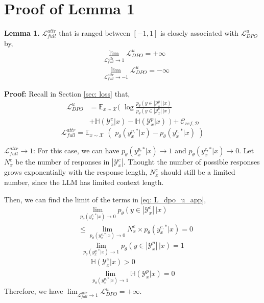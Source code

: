\section{Proof of Lemma 1} \label{sec: lemma1}

\noindent\textbf{Lemma 1.} $\mathcal L^{attr}_{full}$ that is ranged between $[-1,1]$ is closely associated with $\mathcal L_{DPO}^u$ by,
\begin{align}
    &\lim_{\mathcal L^{attr}_{full}\rightarrow 1}  \mathcal L^u_{DPO} = +\infty \\
    &\lim_{\mathcal L^{attr}_{full}\rightarrow -1}  \mathcal L^u_{DPO} = -\infty 
\end{align}

\noindent \textbf{Proof:}
Recall in Section \ref{sec: loss} that,
%
\begin{equation}
  \begin{split} \label{eq: L_dpo_u_app}
    \mathcal L^u_{DPO} &= \mathbb E_{x\sim \mathcal X } ( \,\,\log \frac{p_\theta(y\in |\mathcal Y^p_x|\,|x)}{p_\theta(y\in |\mathcal Y^c_x|\,|x)} \\
    &+ \mathbb H(\mathcal Y^c_x|x) - \mathbb H(\mathcal Y^p_x|x) \,\,) + \mathcal C_{ref, \mathcal D}
  \end{split}
\end{equation}
%
\begin{equation} \label{eq: attr_full_app}
    \mathcal L^{attr}_{full} = \mathbb E_{x\sim \mathcal X} \,\,(\,\,p_\theta(y^{p,*}_x|x) - p_\theta(y^{c,*}_x|x)\,\,)
\end{equation}
%
\vspace{0.5mm}

\noindent $\mathcal L^{attr}_{full}\rightarrow 1$: For this case,  we can have $p_\theta(y^{p,*}_x|x) \rightarrow 1$ and $p_\theta(y^{c,*}_x|x) \rightarrow 0$.
Let $N^c_x$ be the number of responses in $|\mathcal Y^c_x|$. Thought the number of possible responses grows exponentially with the response length,  $N^c_x$ should still be a limited number, since the LLM has limited context length.

\vspace{1mm}
\noindent Then, we can find the limit of the terms in \eqref{eq: L_dpo_u_app},
%
\begin{equation}
\begin{split}
    &\lim_{p_\theta(y^{c,*}_x|x) \rightarrow 0} p_\theta(y\in |\mathcal Y^c_x|\,|x) \\
    &\leq \lim_{p_\theta(y^{c,*}_x|x) \rightarrow 0} N^c_x \times p_\theta(y^{c,*}_x|x) = 0
\end{split}
\end{equation}
%
\begin{equation}
    \lim_{p_\theta(y^{p,*}_x|x) \rightarrow 1} p_\theta(y\in |\mathcal Y^p_x|\,|x) = 1
\end{equation}
%
\begin{align}
     \mathbb H(\mathcal Y^c_x|x) > 0 \\
    \lim_{p_\theta(y^{p,*}_x|x) \rightarrow 1} \mathbb H(\mathcal Y^p_x|x) = 0
\end{align}
%
Therefore, we have $\lim_{\mathcal L^{attr}_{full}\rightarrow 1}  \mathcal L^u_{DPO} = +\infty$.

